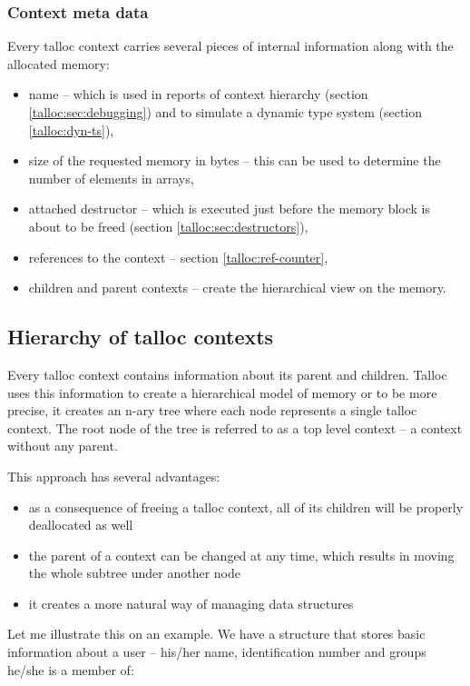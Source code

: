 \subsubsection{Context meta data}
Every talloc context carries several pieces of internal information along with
the allocated memory:

\begin{itemize}
  \item name -- which is used in reports of context hierarchy (section
  \ref{talloc:sec:debugging}) and to simulate a dynamic type system (section
  \ref{talloc:dyn-ts}),
  \item size of the requested memory in bytes -- this can be used to determine
  the number of elements in arrays,
  \item attached destructor -- which is executed just before the memory block is
  about to be freed (section \ref{talloc:sec:destructors}),
  \item references to the context -- section \ref{talloc:ref-counter},
  \item children and parent contexts -- create the hierarchical view on the
  memory.
\end{itemize}

\subsection{Hierarchy of talloc contexts}

Every talloc context contains information about its parent and children. Talloc
uses this information to create a hierarchical model of memory or to be more
precise, it creates an n-ary tree where each node represents a single talloc
context. The root node of the tree is referred to as a top level context -- a
context without any parent.

This approach has several advantages:

\begin{itemize}
  \item as a consequence of freeing a talloc context, all of its children
  will be properly deallocated as well
  \item the parent of a context can be changed at any time, which
  results in moving the whole subtree under another node
  \item it creates a more natural way of managing data structures
\end{itemize}

\noindent
Let me illustrate this on an example. We have a structure that stores basic
information about a user -- his/her name, identification number and groups
he/she is a member of:

